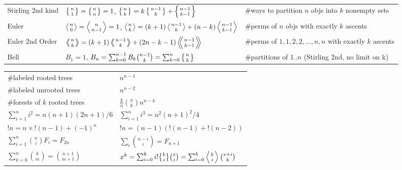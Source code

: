 \documentclass[11.5pt,a4paper,landscape,oneside]{amsart}
\DeclareRobustCommand{\stirling}{\genfrac\{\}{0pt}{}}
\begin{document}
\begin{multicols*}{2}
\begin{tabular}{@{}l|l|l@{}}
    Stirling 2nd kind & $\left\{{n\atop 1}\right\}=\left\{{n\atop n}\right\}=1$, $\left\{{n\atop k}\right\} = k \left\{{ n-1 \atop k }\right\} + \left\{{n-1\atop k-1}\right\}$ & \#ways to partition $n$ objs into $k$ nonempty sets\\
    Euler	& $\left \langle {n\atop 0} \right \rangle = \left \langle {n\atop n-1} \right \rangle = 1 $, $\left \langle {n\atop k} \right \rangle = (k+1) \left \langle {n-1\atop {k}} \right \rangle + (n-k)\left \langle {{n-1}\atop {k-1}} \right \rangle$ & \#perms of $n$ objs with exactly $k$ ascents \\
    Euler 2nd Order &  $\left \langle \!\!\left \langle {n\atop k} \right \rangle \!\! \right \rangle = (k+1) \left \langle \!\! \left \langle {{n-1}\atop {k}} \right \rangle \!\! \right \rangle +(2n-k-1)\left \langle \!\! \left \langle {{n-1}\atop {k-1}} \right \rangle  \!\! \right \rangle$ & \#perms of ${1,1,2,2,...,n,n}$ with exactly $k$ ascents \\
    Bell & $B_1 = 1$, $B_n = \sum_{k=0}^{n-1} B_k \binom{n-1}{k} = \sum_{k=0}^n\left\{{n\atop k}\right\}$ & \#partitions of $1..n$ (Stirling 2nd, no limit on k)\\
    \bottomrule
    \end{tabular}

    \vspace{10pt}
    \begin{tabular}{ll}
        \#labeled rooted trees & $n^{n-1}$ \\
        \#labeled unrooted trees & $n^{n-2}$ \\
        \#forests of $k$ rooted trees & $\frac{k}{n}\binom{n}{k}n^{n-k}$ \\
        $\sum_{i=1}^n i^2 = n(n+1)(2n+1)/6$ & $\sum_{i=1}^n i^3 = n^2(n+1)^2/4$ \\
        $!n = n\times!(n-1)+(-1)^n$ & $!n = (n-1)(!(n-1)+!(n-2))$ \\
        $\sum_{i=1}^n \binom{n}{i} F_i = F_{2n}$ & $\sum_{i} \binom{n-i}{i} = F_{n+1}$ \\
        $\sum_{k=0}^n \binom{k}{m} = \binom{n+1}{m+1}$ & $x^k = \sum_{i=0}^k i!\stirling{k}{i}\binom{x}{i} = \sum_{i=0}^k \left\langle {k \atop i} \right\rangle\binom{x+i}{k}$ \\


\end{tabular}
\end{multicols*}
\end{document}
